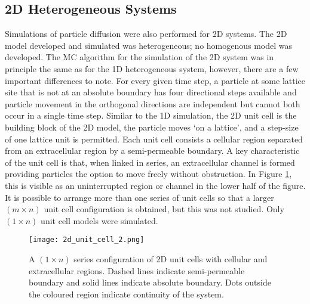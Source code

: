 \subsection{2D Heterogeneous Systems}
\label{section:mc-sims-2D}
	Simulations of particle diffusion were also performed for 2D systems. The 2D model developed and simulated was heterogeneous; no homogenous model was developed. The MC algorithm for the simulation of the 2D system was in principle the same as for the 1D heterogeneous system, however, there are a few important differences to note. For every given time step, a particle at some lattice site that is not at an absolute boundary has four directional steps available and particle movement in the orthogonal directions are independent but cannot both occur in a single time step. Similar  to the 1D simulation, the 2D unit cell is the building block of the 2D model, the particle moves `on a lattice', and a step-size of one lattice unit is permitted. Each unit cell consists a cellular region separated from an extracellular region by a semi-permeable boundary. A key characteristic of the unit cell is that, when linked in series, an extracellular channel is formed providing particles the option to move freely without obstruction. In Figure \ref{fig:2d_unit_cell_2.png}, this is visible as an uninterrupted region or channel in the lower half of the figure. It is possible to arrange more than one series of unit cells so that a larger $\left(  m \times n \right) $ unit cell configuration is obtained, but this was not studied. Only $\left(  1 \times n \right) $ unit cell models were simulated. 
	
	\begin{figure}[h]
		\centering
		\texttt{[image: 2d\_unit\_cell\_2.png]}
		\caption{A $ \left( 1 \times n \right) $ series configuration of 2D unit cells with cellular and extracellular regions. Dashed lines indicate semi-permeable boundary and solid lines indicate absolute boundary. Dots outside the coloured region indicate continuity of the system.}
		\label{fig:2d_unit_cell_2.png}
	\end{figure}
	
